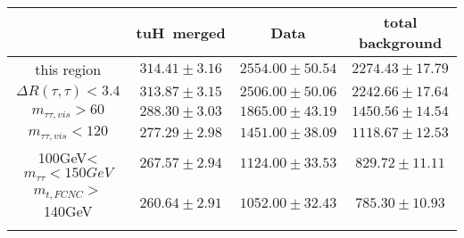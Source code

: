 \begin{tabular}{cccc} \toprule\toprule
 & tuH~merged & Data & total background\\\midrule
this region & $314.41\pm3.16$ & $2554.00\pm50.54$ & $2274.43\pm17.79$\\
$\Delta R(\tau,\tau)<3.4$ & $313.87\pm3.15$ & $2506.00\pm50.06$ & $2242.66\pm17.64$\\
$m_{\tau\tau,vis}>60$ & $288.30\pm3.03$ & $1865.00\pm43.19$ & $1450.56\pm14.54$\\
$m_{\tau\tau,vis}<120$ & $277.29\pm2.98$ & $1451.00\pm38.09$ & $1118.67\pm12.53$\\
100GeV<$m_{\tau\tau}<150GeV$ & $267.57\pm2.94$ & $1124.00\pm33.53$ & $829.72\pm11.11$\\
$m_{t,FCNC}>$140GeV & $260.64\pm2.91$ & $1052.00\pm32.43$ & $785.30\pm10.93$\\
\bottomrule\bottomrule\\
\end{tabular}


